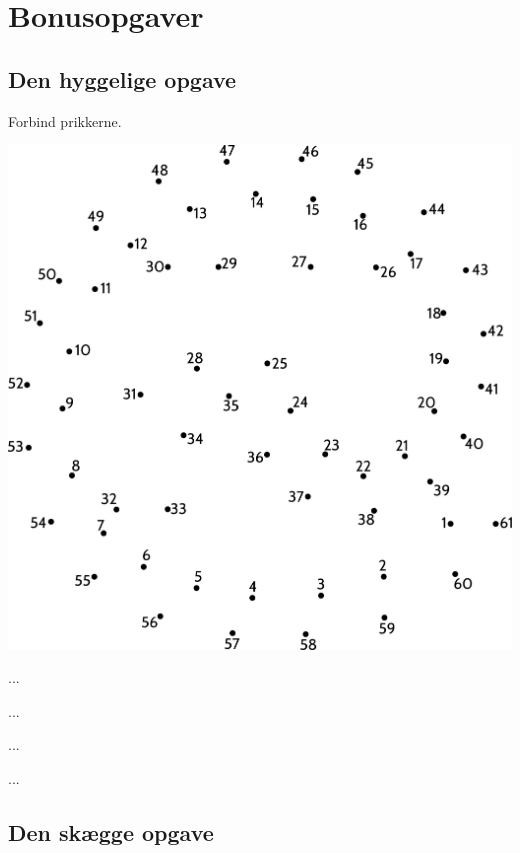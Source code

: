 \section{\huge{Bonusopgaver}}

\subsection{Den hyggelige opgave}

Forbind prikkerne.

\begin{center}
\includegraphics[width=.9\textwidth]{forbind-prikkerne.pdf}
\end{center}

\newpage

...



\newpage

...

\newpage

...

\newpage

...

\newpage

\subsection{Den skægge opgave}


